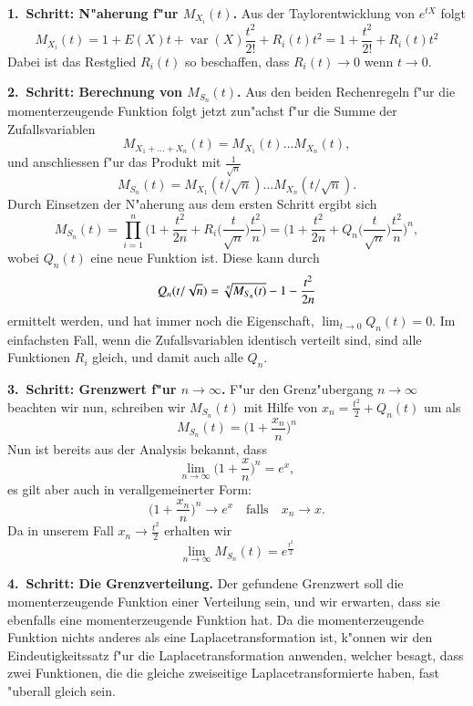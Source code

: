 {\parindent0pt\bf 1.~Schritt: N"aherung f"ur $M_{X_i}(t)$.} 
Aus der Taylorentwicklung von $e^{tX}$ folgt
\[
M_{X_i}(t)=1+E(X)t+\operatorname{var}(X)\frac{t^2}{2!}+R_i(t)t^2
=1+\frac{t^2}{2!}+R_i(t)t^2
\]
Dabei ist das Restglied $R_i(t)$ so beschaffen, dass
$R_i(t)\to 0$ wenn $t\to 0$.

\medskip
{\parindent0pt\bf 2.~Schritt: Berechnung von $M_{S_n}(t)$.}
Aus den beiden Rechenregeln f"ur die momenterzeugende Funktion folgt
jetzt zun"achst f"ur die Summe der Zufallsvariablen
\[
M_{X_1+\dots+X_n}(t)=M_{X_1}(t)\dots M_{X_n}(t),
\]
und anschliessen f"ur das Produkt mit $\frac1{\sqrt{n}}$
\[
M_{S_n}(t)=M_{X_1}(t/\sqrt{n})\dots M_{X_n}(t/\sqrt{n}).
\]
Durch Einsetzen der N"aherung aus dem ersten Schritt ergibt sich
\[
M_{S_n}(t)
=\prod_{i=1}^n\biggl(1+\frac{t^2}{2n}+R_i\biggl(\frac{t}{\sqrt{n}}\biggl)\frac{t^2}{n}\biggr)
=\biggl(1+\frac{t^2}{2n}+Q_n\biggl(\frac{t}{\sqrt{n}}\biggr)\frac{t^2}{n}\biggr)^n,
\]
wobei $Q_n(t)$ eine neue Funktion ist. Diese kann durch
\[
Q_n(t/\sqrt{n})=\root{n}\of{M_{S_n}(t)}-1-\frac{t^2}{2n}
\]
ermittelt werden, und hat immer noch die Eigenschaft,
$\lim_{t\to0}Q_n(t)=0$. Im einfachsten Fall, wenn die Zufallsvariablen
identisch verteilt sind, sind alle Funktionen $R_i$ gleich, und damit
auch alle $Q_n$.

\medskip
{\parindent0pt\bf 3.~Schritt: Grenzwert f"ur $n\to\infty$.}
F"ur den Grenz"ubergang $n\to\infty$ beachten wir nun, schreiben wir
$M_{S_n}(t)$ mit Hilfe von
$x_n=\frac{t^2}2+Q_n(t)$
um als
\[
M_{S_n}(t)=\biggl(1+\frac{x_n}n\biggr)^n
\]
Nun ist bereits aus der Analysis bekannt, dass
\[
\lim_{n\to\infty}\biggl(1+\frac{x}{n}\biggr)^n=e^x,
\]
es gilt aber auch in verallgemeinerter Form:
\[
\biggl(1+\frac{x_n}{n}\biggr)^n\to e^x\quad\text{falls}\quad x_n\to x.
\]
Da in unserem Fall $x_n\to \frac{t^2}2$ erhalten wir
\[
\lim_{n\to\infty}M_{S_n}(t)=e^{\frac{t^2}{2}}
\]

\medskip
{\parindent0pt\bf 4.~Schritt: Die Grenzverteilung.}
Der gefundene Grenzwert soll die momenterzeugende Funktion einer
Verteilung sein, und wir erwarten, dass sie ebenfalls eine
momenterzeugende Funktion hat. Da die momenterzeugende Funktion
nichts anderes als eine Laplacetransformation ist, k"onnen wir
den Eindeutigkeitssatz f"ur die Laplacetransformation anwenden,
welcher besagt, dass zwei Funktionen, die die gleiche zweiseitige
Laplacetransformierte haben, fast "uberall gleich sein.


